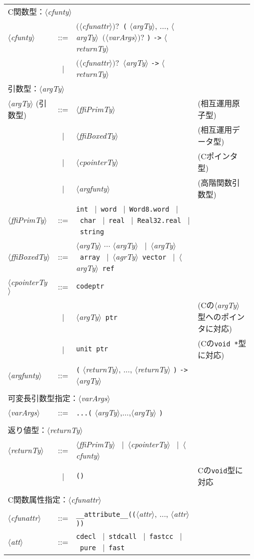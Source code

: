 \documentclass{jbook}
\newcommand{\code}[1]{\mbox{\large\tt #1}}
\newcommand{\vbar}{\mbox{\ $|$\ }}
\newcommand{\nonterm}[1]{\mbox{$\langle$}{\it #1}\mbox{$\rangle$}}
\newcommand{\term}[1]{\mbox{{\tt #1}}}
\newcommand{\optional}[1]{\mbox{$($}{\protect #1}\mbox{$)?$}}
\begin{document}
\begin{center}
\begin{tabular}{lcll}
\multicolumn{3}{l}{C関数型：\nonterm{cfunty}}\\
\nonterm{cfunty} &::=& 
   \optional{\nonterm{cfunattr}}\ 
   \term{(} \nonterm{argTy}, $\ldots$, \nonterm{argTy}\
       \optional{\nonterm{varArgs}} \term{)} 
   \term{->} \nonterm{returnTy}\\
&\vbar &    \optional{\nonterm{cfunattr}}\ \nonterm{argTy} \term{->} \nonterm{returnTy}
\\
\multicolumn{3}{l}{引数型：\nonterm{argTy}}
\\
\nonterm{argTy} (引数型) &::=&  
   \nonterm{ffiPrimTy}       & (相互運用原子型) \\
&\vbar& \nonterm{ffiBoxedTy} & (相互運用データ型)\\
&\vbar& \nonterm{cpointerTy} & (Cポインタ型)\\
&\vbar& \nonterm{argfunty}   & (高階関数引数型)\\
\nonterm{ffiPrimTy} &::=& 
   \term{int} 
   \vbar \term{word} 
   \vbar \term{Word8.word} 
   \vbar \term{char}
   \vbar \term{real} 
   \vbar \term{Real32.real}
   \vbar \term{string} \\
\nonterm{ffiBoxedTy} &::=&  
  \nonterm{argTy} \term{*} $\cdots$ \term{*} \nonterm{argTy}
  \vbar \nonterm{argTy}\ \term{array}
  \vbar \nonterm{agrTy}\ \term{vector}
  \vbar \nonterm{argTy}\ \term{ref} \\ 
\nonterm{cpointerTy} &::=& \term{codeptr}\\
   &\vbar& \nonterm{argTy}\ \term{ptr}  & (Cの\nonterm{argTy}型へのポインタに対応)\\
    &\vbar& \term{unit\ ptr}            & (Cの\code{void *}型に対応)\\
\nonterm{argfunty} &::=& 
     \term{(} \nonterm{returnTy}, $\ldots$, \nonterm{returnTy} \term{)} \term{->} \nonterm{argTy}\\
\\
\multicolumn{3}{l}{可変長引数型指定：\nonterm{varArgs}}\\
\nonterm{varArgs} &::=& 
   \term{...(} \nonterm{argTy},$\ldots$,\nonterm{argTy} \term{)}\\
\\
\multicolumn{3}{l}{返り値型：\nonterm{returnTy}}
\\
\nonterm{returnTy} &::=& 
   \nonterm{ffiPrimTy} 
   \vbar \nonterm{cpointerTy}
   \vbar \nonterm{cfunty}\\
   &\vbar& \term{()}  & Cの\code{void}型に対応\\
\\
\multicolumn{3}{l}{C関数属性指定：\nonterm{cfunattr}}\\
\nonterm{cfunattr}
  &::=& \term{\_\_attribute\_\_((}\nonterm{attr}, $\ldots$, \nonterm{attr}\term{))}\\
\nonterm{att} &::=&
\term{cdecl}
\vbar \term{stdcall}
\vbar \term{fastcc}
\vbar \term{pure}
\vbar \term{fast}
\end{tabular}
\end{center}
\end{document}
